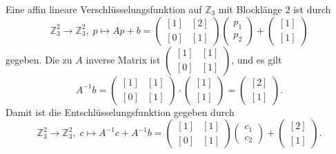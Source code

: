 \begin{example}
Eine affin lineare Verschlüsselungsfunktion auf $ℤ_3$ mit Blocklänge $2$ ist durch 
 \[ℤ_3^2 → ℤ_3^2, \; p ↦ Ap + b = \begin{pmatrix}
                     [1] & [2] \\
                     [0] & [1]
                    \end{pmatrix}
                    \begin{pmatrix}
                    p_1 \\
                    p_2
                    \end{pmatrix}+
                    \begin{pmatrix}
                     [1] \\
                     [1]
                    \end{pmatrix}
\]
gegeben. Die zu $A$ inverse Matrix ist $\begin{pmatrix}
                     [1] & [1] \\
                     [0] & [1]
                    \end{pmatrix}$,
und es gilt 
\[A^{-1}b =  \begin{pmatrix}
                     [1] & [1] \\
                     [0] & [1]
                    \end{pmatrix} \cdot 
  \begin{pmatrix}
                     [1] \\
                     [1]
                    \end{pmatrix} =
                     \begin{pmatrix}
                     [2] \\
                     [1]
                    \end{pmatrix}.
\]                    
Damit ist die Entschlüsselungsfunktion gegeben durch                    
 \[ℤ_3^2 → ℤ_3^2, \; c ↦ A^{-1}c + A^{-1}b = \begin{pmatrix}
                    [1] & [1] \\
                     [0] & [1]
                    \end{pmatrix}
                    \begin{pmatrix}
                    c_1 \\
                    c_2
                    \end{pmatrix}+
                    \begin{pmatrix}
                     [2] \\
                     [1]
                    \end{pmatrix}.
\]

\end{example}

